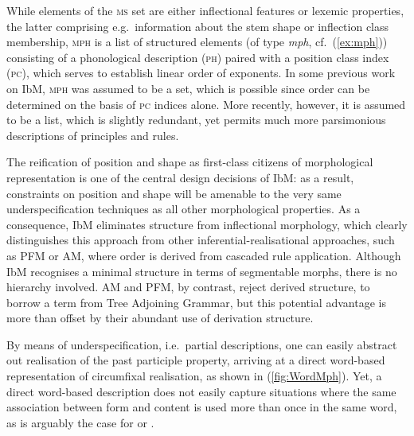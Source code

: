 \documentclass[output=paper,biblatex,babelshorthands,newtxmath,draftmode,colorlinks,citecolor=brown]{langscibook}
\begin{document}
\begin{exe}
\begin{xlist}
\begin{exe}
\begin{xlist}
  \end{xlist}
\end{exe}
While elements of the \textsc{ms} set
are either inflectional features or lexemic properties, the latter
comprising e.g.\ information about the stem shape or inflection class
membership, \textsc{mph} is a list of structured elements (of type
\textit{mph}, cf.~(\ref{ex:mph})) consisting
of a phonological description (\textsc{ph}) paired with a position
class index (\textsc{pc}), which serves to establish linear order of
exponents. In some previous work on IbM, \textsc{mph} was assumed to
be a set, which is possible since order can be determined on the basis
of \textsc{pc} indices alone. More recently, however, it is assumed to
be a list, which is slightly redundant, yet permits much more
parsimonious descriptions of principles and rules.

\begin{exe}
  \ex \label{ex:mph} 
\end{exe}

\largerpage
The reification of position and shape as first-class citizens of
morphological representation is one of the central design decisions of
IbM: as a result, constraints on position and shape will be amenable
to the very same underspecification techniques as all other
morphological properties. As a consequence, IbM eliminates structure
from inflectional morphology, which clearly distinguishes this
approach from other inferential-realisational approaches, such as PFM
or AM, where order is derived from cascaded rule application.
Although IbM recognises a minimal structure in terms of segmentable
morphs, there is no hierarchy involved. AM and PFM, by contrast,
reject derived structure, to borrow a term from Tree Adjoining
Grammar, but this potential advantage is more than offset by their
abundant use of derivation structure.

By means of underspecification, i.e.\ partial descriptions, one can
easily abstract out realisation of the past participle property,
arriving at a direct word-based representation of circumfixal
realisation, as shown in (\ref{fig:WordMph}).  Yet, a direct
word-based description does not easily capture situations where the
same association between form and content is used more than once in
the same word, as is arguably the case for 
\citep{Stump93,Crysmann:Bonami:2016,Crysmann:Bonami:2017:HPSG} or  \citep{Harris09,Crysmann:2018:Batsbi}.


\end{xlist}
\end{exe}
\end{document}
